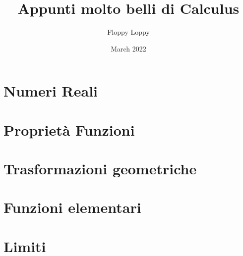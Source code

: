 \documentclass[a4paper]{article}
\theoremstyle{definition}
\begin{document}
\title{Appunti molto belli di Calculus}
\author{Floppy Loppy}
\date{March 2022}
\maketitle
\tableofcontents




\newpage
\section{Numeri Reali}\label{sec:introduzione}



\newpage
\section{Proprietà Funzioni}\label{sec:proprietà_funzioni}



\newpage
\section{Trasformazioni geometriche}\label{sec:trasformazioni_gemoetriche}



\newpage
\section{Funzioni elementari}\label{sec:funzioni_elementari}



\newpage
\section{Limiti}\label{sec:limiti}

\end{document}
